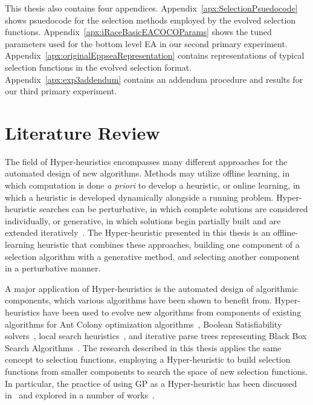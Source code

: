 \documentclass[sigconf]{acmart}
\begin{document}
This thesis also contains four appendices. Appendix~\ref{apx:SelectionPsuedocode} shows psuedocode for the selection methods employed by the evolved selection functions. Appendix~\ref{apx:iRaceBasicEACOCOParams} shows the tuned parameters used for the bottom level EA in our second primary experiment. Appendix~\ref{apx:originalEppseaRepresentation} contains representations of typical selection functions in the evolved selection format. Appendix~\ref{apx:exp3addendum} contains an addendum procedure and results for our third primary experiment.

\section{Literature Review}
\label{Literature Review}
The field of Hyper-heuristics encompasses many different approaches for the automated design of new algorithms. Methods may utilize offline learning, in which computation is done \textit{a priori} to develop a heuristic, or online learning, in which a heuristic is developed dynamically alongside a running problem. Hyper-heuristic searches can be perturbative, in which complete solutions are considered individually, or generative, in which solutions begin partially built and are extended iteratively~\citep{burke2013HHstateoftheart}. The Hyper-heuristic presented in this thesis is an offline-learning heuristic that combines these approaches, building one component of a selection algorithm with a generative method, and selecting another component in a perturbative manner.

A major application of Hyper-heuristics is the automated design of algorithmic components, which various algorithms have been shown to benefit from. Hyper-heuristics have been used to evolve new algorithms from components of existing algorithms for Ant Colony optimization algorithms~\citep{lopez2012antcol}, Boolean Satisfiability solvers~\citep{khudabukhsh2009satenstein}, local search heuristics~\citep{burke2012localHeuristics}, and iterative parse trees representing Black Box Search Algorithms~\citep{martin2013evolvingBBSA}. The research described in this thesis applies the same concept to selection functions, employing a Hyper-heuristic to build selection functions from smaller components to search the space of new selection functions. In particular, the practice of using GP as a Hyper-heuristic has been discussed in~\citep{burke2009exploring} and explored in a number of works~\citep{burke2010strippacking, burke2006binpacking, harris2015comparison}. 
\end{document}
